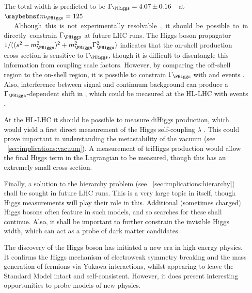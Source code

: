 The total width is predicted to be \unit{$\Gamma_{\PHiggs} = 4.07 \pm 0.16$}{\MeV} at 
\unit{$\mH = 125$}{\GeV} \cite{YR3}. Although this is not experimentally resolvable, it 
should be possible to indirectly constrain $\Gamma_{\PHiggs}$ at future LHC runs.
The Higgs boson propagator $1/((s^2 - m_{\PHiggs}^2)^2 + m_{\PHiggs}^2\Gamma_{\PHiggs}^2)$ 
indicates that the on-shell production cross section is sensitive to $\Gamma_{\PHiggs}$, 
though it is difficult to disentangle this information from coupling scale factors. 
However, by comparing the off-shell region to the on-shell region, it is possible to 
constrain $\Gamma_{\PHiggs}$ with \HepProcess{\PHiggs \HepTo \PZ\PZ} and \HWW events 
\cite{Caola:2013,Campbell:2013HZZ,Campbell:2013HWW}.
Also, interference between signal and continuum background can produce a 
$\Gamma_{\PHiggs}$-dependent shift in \mH, which could be measured at the HL-LHC with 
\HepProcess{\PHiggs \HepTo \Pphoton\Pphoton} events \cite{Dixon:2013,Martin:2013}.

At the HL-LHC it should be possible to measure diHiggs production, which would yield a 
first direct measurement of the Higgs self-coupling $\lambda$ \cite{DiHiggs}. This could 
prove important in understanding the metastability of the vacuum (see 
\Section~\ref{sec:implications:vacuum}). A measurement of triHiggs production would allow 
the final Higgs term in the Lagrangian to be measured, though this has an extremely small 
cross section.

Finally, a solution to the hierarchy problem (see 
\Section~\ref{sec:implications:hierarchy}) shall be sought in future LHC runs. This is a 
very large topic in itself, though Higgs measurements will play their role in this. 
Additional (sometimes charged) Higgs bosons often feature in such models, and so searches 
for these shall continue. Also, it shall be important to further constrain the invisible 
Higgs width, which can act as a probe of dark matter candidates.

The discovery of the Higgs boson has initiated a new era in high energy physics. It 
confirms the Higgs mechanism of electroweak symmetry breaking and the mass generation of 
fermions via Yukawa interactions, whilst appearing to leave the Standard Model intact and 
self-consistent. However, it does present interesting opportunities to probe models of new 
physics.


